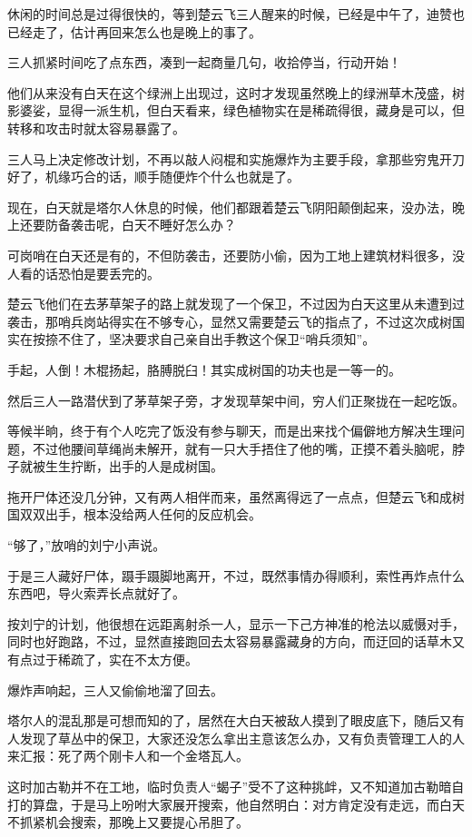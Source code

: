 休闲的时间总是过得很快的，等到楚云飞三人醒来的时候，已经是中午了，迪赞也已经走了，估计再回来怎么也是晚上的事了。

三人抓紧时间吃了点东西，凑到一起商量几句，收拾停当，行动开始！

他们从来没有白天在这个绿洲上出现过，这时才发现虽然晚上的绿洲草木茂盛，树影婆娑，显得一派生机，但白天看来，绿色植物实在是稀疏得很，藏身是可以，但转移和攻击时就太容易暴露了。

三人马上决定修改计划，不再以敲人闷棍和实施爆炸为主要手段，拿那些穷鬼开刀好了，机缘巧合的话，顺手随便炸个什么也就是了。

现在，白天就是塔尔人休息的时候，他们都跟着楚云飞阴阳颠倒起来，没办法，晚上还要防备袭击呢，白天不睡好怎么办？

可岗哨在白天还是有的，不但防袭击，还要防小偷，因为工地上建筑材料很多，没人看的话恐怕是要丢完的。

楚云飞他们在去茅草架子的路上就发现了一个保卫，不过因为白天这里从未遭到过袭击，那哨兵岗站得实在不够专心，显然又需要楚云飞的指点了，不过这次成树国实在按捺不住了，坚决要求自己亲自出手教这个保卫“哨兵须知”。

手起，人倒！木棍扬起，胳膊脱臼！其实成树国的功夫也是一等一的。

然后三人一路潜伏到了茅草架子旁，才发现草架中间，穷人们正聚拢在一起吃饭。

等候半晌，终于有个人吃完了饭没有参与聊天，而是出来找个偏僻地方解决生理问题，不过他腰间草绳尚未解开，就有一只大手捂住了他的嘴，正摸不着头脑呢，脖子就被生生拧断，出手的人是成树国。

拖开尸体还没几分钟，又有两人相伴而来，虽然离得远了一点点，但楚云飞和成树国双双出手，根本没给两人任何的反应机会。

“够了，”放哨的刘宁小声说。

于是三人藏好尸体，蹑手蹑脚地离开，不过，既然事情办得顺利，索性再炸点什么东西吧，导火索弄长点就好了。

按刘宁的计划，他很想在远距离射杀一人，显示一下己方神准的枪法以威慑对手，同时也好跑路，不过，显然直接跑回去太容易暴露藏身的方向，而迂回的话草木又有点过于稀疏了，实在不太方便。

爆炸声响起，三人又偷偷地溜了回去。

塔尔人的混乱那是可想而知的了，居然在大白天被敌人摸到了眼皮底下，随后又有人发现了草丛中的保卫，大家还没怎么拿出主意该怎么办，又有负责管理工人的人来汇报：死了两个刚卡人和一个金塔瓦人。

这时加古勒并不在工地，临时负责人“蝎子”受不了这种挑衅，又不知道加古勒暗自打的算盘，于是马上吩咐大家展开搜索，他自然明白：对方肯定没有走远，而白天不抓紧机会搜索，那晚上又要提心吊胆了。

